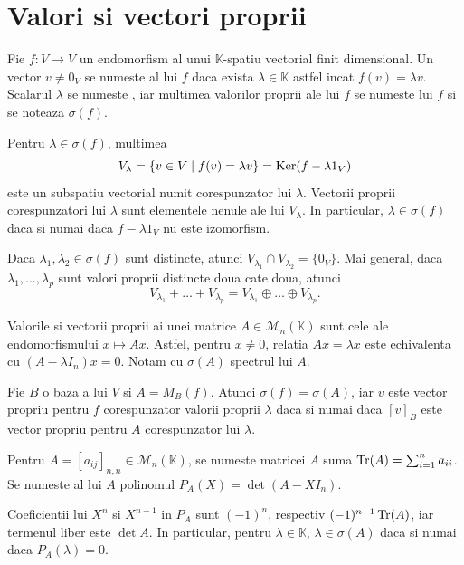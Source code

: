 \documentclass{article}
\begin{document}
\section{Valori si vectori proprii}
\begin{enumerate}

   Fie $f : V\to V$ un endomorfism al unui $\mathbb K$-spatiu vectorial finit dimensional. Un vector $v\neq 0_V$ se numeste  al lui $f$ daca exista $\lambda\in\mathbb K$ astfel incat $f(v)=\lambda v$. Scalarul $\lambda$ se numeste , iar multimea valorilor proprii ale lui $f$ se numeste  lui $f$ si se noteaza $\sigma(f)$.

  \proprietate Pentru $\lambda\in\sigma(f)$, multimea
  \[
    V_\lambda=\{v\in V\mid f(v)=\lambda v\}=\operatorname{Ker}(f-\lambda 1_V)
  \]
  este un subspatiu vectorial numit  corespunzator lui $\lambda$. Vectorii proprii corespunzatori lui $\lambda$ sunt elementele nenule ale lui $V_\lambda$. In particular, $\lambda\in\sigma(f)$ daca si numai daca $f-\lambda 1_V$ nu este izomorfism.

  \propozitie Daca $\lambda_1,\lambda_2\in\sigma(f)$ sunt distincte, atunci $V_{\lambda_1}\cap V_{\lambda_2}=\{0_V\}$. Mai general, daca $\lambda_1,\dots,\lambda_p$ sunt valori proprii distincte doua cate doua, atunci
  \[
    V_{\lambda_1}+\dots+V_{\lambda_p}=V_{\lambda_1}\oplus\dots\oplus V_{\lambda_p}.
  \]

  \observatie Valorile si vectorii proprii ai unei matrice $A\in\mathcal M_n(\mathbb K)$ sunt cele ale endomorfismului $x\mapsto Ax$. Astfel, pentru $x\neq 0$, relatia $Ax=\lambda x$ este echivalenta cu $(A-\lambda I_n)x=0$. Notam cu $\sigma(A)$ spectrul lui $A$.

  \propozitie Fie $B$ o baza a lui $V$ si $A=M_B(f)$. Atunci $\sigma(f)=\sigma(A)$, iar $v$ este vector propriu pentru $f$ corespunzator valorii proprii $\lambda$ daca si numai daca $[v]_B$ este vector propriu pentru $A$ corespunzator lui $\lambda$.

   Pentru $A=[a_{ij}]_{n,n}\in\mathcal M_n(\mathbb K)$, se numeste  matricei $A$ suma $\operatorname{Tr}(A)=\sum_{i=1}^n a_{ii}$. Se numeste  al lui $A$ polinomul $P_A(X)=\det(A-X I_n)$.

  \proprietate Coeficientii lui $X^n$ si $X^{n-1}$ in $P_A$ sunt $(-1)^n$, respectiv $(-1)^{n-1}\operatorname{Tr}(A)$, iar termenul liber este $\det A$. In particular, pentru $\lambda\in\mathbb K$, $\lambda\in\sigma(A)$ daca si numai daca $P_A(\lambda)=0$.


\end{enumerate}
\end{document}
